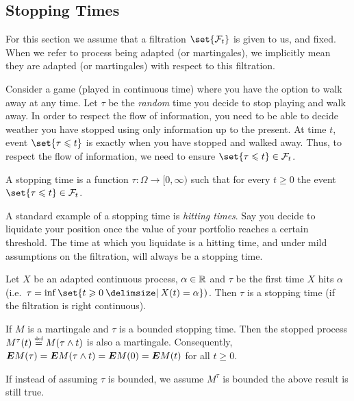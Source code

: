 \subsection{Stopping Times}

For this section we assume that a filtration $\set{\mathcal F_t}$ is given to us, and fixed.
When we refer to process being adapted (or martingales), we implicitly mean they are adapted (or martingales) with respect to this filtration.

Consider a game (played in continuous time) where you have the option to walk away at any time.
Let $\tau$ be the \emph{random} time you decide to stop playing and walk away.
In order to respect the flow of information, you need to be able to decide weather you have stopped using only information up to the present.
At time $t$, event $\set{\tau \leq t}$ is exactly when you have stopped and walked away.
Thus, to respect the flow of information, we need to ensure $\set{\tau \leq t} \in \mathcal F_t$.

\begin{definition}
  A stopping time is a function $\tau\colon \Omega \to [0, \infty)$ such that for every $t \geq 0$ the event $\set{\tau \leq t} \in \mathcal F_t$.
\end{definition}

A standard example of a stopping time is \emph{hitting times}.
Say you decide to liquidate your position once the value of your portfolio reaches a certain threshold.
The time at which you liquidate is a hitting time, and under mild assumptions on the filtration, will always be a stopping time.

\begin{proposition}
  Let $X$ be an adapted continuous process, $\alpha \in \mathbb{R}$ and $\tau$ be the first time $X$ hits $\alpha$ (i.e.\ $\tau  = \inf\set{t \geq 0 \st X(t) = \alpha })$.
  Then $\tau$ is a stopping time (if the filtration is right continuous).
\end{proposition}

\begin{theorem}
  If $M$ is a martingale and $\tau$ is a bounded stopping time.
  Then the stopped process $M^\tau(t) \stackrel{\scriptscriptstyle\textup{def}}{=} M(\tau \wedge t)$ is also a martingale.
  Consequently, $\bm{E} M(\tau) = \bm{E} M(\tau \wedge t) = \bm{E} M(0) = \bm{E} M(t)$ for all $t \geq 0$.
\end{theorem}
\begin{remark}
  If instead of assuming $\tau$ is bounded, we assume $M^\tau$ is bounded the above result is still true.
\end{remark}

